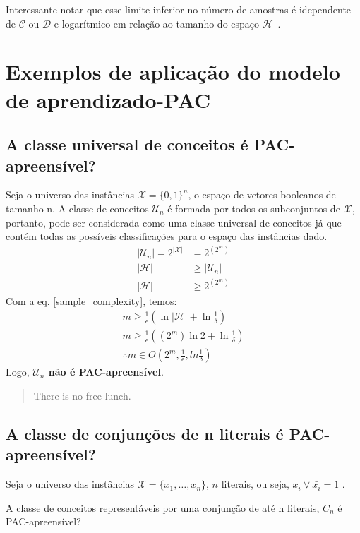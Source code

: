 \documentclass[
10pt, %
a4paper, %
onecolumn, %
]{article}
\begin{document}
Interessante notar que esse limite inferior no número de amostras é idependente de $\mathcal{C}$ ou $\mathcal{D}$ e logarítmico em relação ao tamanho do espaço $\mathcal{H}$~\cite{Haussler1988}.

\section{Exemplos de aplicação do modelo de aprendizado-PAC}
\subsection{A classe universal de conceitos é PAC-apreensível?}
Seja o universo das instâncias $\mathcal{X}=\{0,1\}^{n}$, o espaço de vetores booleanos de tamanho n. A classe de conceitos $\mathcal{U}_n$ é formada por todos os subconjuntos de $\mathcal{X}$, portanto, pode ser considerada como uma classe universal de conceitos já que contém todas as possíveis classificações para o espaço das instâncias dado.
\begin{align}
    |\mathcal{U}_n| = 2^{|\mathcal{X}|}&=2^{(2^m)} \\
    |\mathcal{H}| &\geq |\mathcal{U}_n| \\
    |\mathcal{H}| &\geq 2^{(2^m)}
\end{align}
Com a eq. \ref{sample_complexity}, temos:
\begin{align}
    m \geq \frac{1}{\epsilon}(\ln{|\mathcal{H}|} + \ln{\frac{1}{\delta}})\\
    m \geq \frac{1}{\epsilon}((2^m)\ln{2} + \ln{\frac{1}{\delta}}) \\
    \therefore m \in O(2^m, \frac{1}{\epsilon}, ln{\frac{1}{\delta}})
\end{align}
Logo, \textbf{$\mathcal{U}_n$ não é PAC-apreensível}. \begin{quote} There is no free-lunch.\end{quote}
\subsection{A classe de conjunções de n literais é PAC-apreensível?}
Seja o universo das instâncias $\mathcal{X}=\{x_1, \ldots, x_n\}$, $n$ literais, ou seja, $x_i \lor \bar{x_i}=1$ . 

A classe de conceitos representáveis por uma conjunção de até n literais, $C_n$ é PAC-apreensível?
\end{document}

